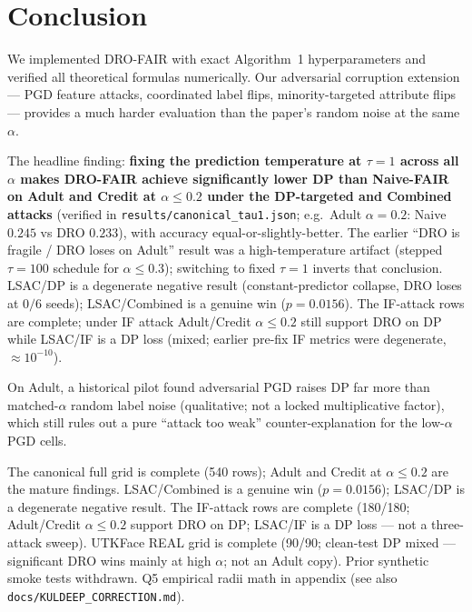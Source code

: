 \documentclass[11pt,a4paper]{article}
\begin{document}
\section{Conclusion}

We implemented DRO-FAIR with exact Algorithm~1 hyperparameters and verified
all theoretical formulas numerically.  Our adversarial corruption extension
--- PGD feature attacks, coordinated label flips, minority-targeted attribute
flips --- provides a much harder evaluation than the paper's random noise
at the same $\alpha$.

The headline finding: \textbf{fixing the prediction temperature at
$\tau{=}1$ across all $\alpha$ makes DRO-FAIR achieve significantly lower DP than Naive-FAIR on Adult and
Credit at $\alpha\le0.2$ under the DP-targeted and Combined attacks}
(verified in \texttt{results/canonical\_tau1.json}; e.g.\ Adult
$\alpha{=}0.2$: Naive $0.245$ vs DRO $0.233$), with accuracy
equal-or-slightly-better.  The earlier ``DRO is fragile /
DRO loses on Adult'' result was a high-temperature artifact (stepped
$\tau{=}100$ schedule for $\alpha{\le}0.3$); switching to fixed $\tau{=}1$
inverts that conclusion.  LSAC/DP is a degenerate negative result
(constant-predictor collapse, DRO loses at $0/6$ seeds); LSAC/Combined is
a genuine win ($p{=}0.0156$).  The IF-attack rows are complete; under IF
attack Adult/Credit $\alpha\le0.2$ still support DRO on DP while LSAC/IF is
a DP loss (mixed; earlier pre-fix IF metrics were degenerate,
$\approx10^{-10}$).

On Adult, a historical pilot found adversarial PGD raises DP far more
than matched-$\alpha$ random label noise (qualitative; not a locked
multiplicative factor), which still rules out a pure ``attack too weak''
counter-explanation for the low-$\alpha$ PGD cells.

The canonical full grid is complete (540 rows); Adult and Credit
at $\alpha\le0.2$ are the mature findings.  LSAC/Combined is a genuine win
($p{=}0.0156$); LSAC/DP is a degenerate negative result.  The IF-attack
rows are complete (180/180; Adult/Credit $\alpha\le0.2$ support DRO on DP;
LSAC/IF is a DP loss --- not a three-attack sweep).  UTKFace REAL grid is
complete (90/90; clean-test DP mixed --- significant DRO wins mainly at
high $\alpha$; not an Adult copy). Prior synthetic smoke tests withdrawn.
Q5 empirical radii math in appendix (see also \texttt{docs/KULDEEP\_CORRECTION.md}).
\end{document}
